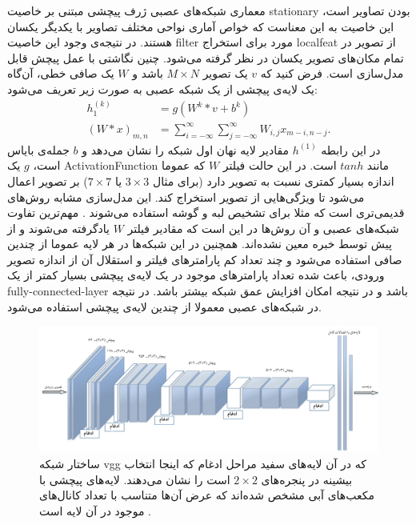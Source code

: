 معماری شبکه‌های عصبی ژرف پیچشی مبتنی بر خاصیت \gls{stationary} بودن تصاویر است، این خاصیت به این معناست که خواص آماری نواحی مختلف تصاویر با یکدیگر یکسان هستند. در نتیجه‌ی وجود این خاصیت \gls{filter} مورد برای استخراج \gls{localfeat} از تصویر در تمام مکان‌های تصویر یکسان در نظر گرفته می‌شود. چنین نگاشتی با عمل پیچش قابل مدل‌سازی است. فرض کنید که $v$ یک تصویر $M\times N$ باشد و $W$ یک صافی خطی، آن‌گاه یک لایه‌ی پیچشی از یک شبکه عصبی به صورت زیر تعریف می‌شود:
\begin{align}
h_1^{(k)} &= g(W^k \ast v + b^k) \label{eq:conv_layer}\\
(W \ast x)_{m,n} &= \sum_{i=-\infty}^{\infty} \sum_{j=-\infty}^{\infty} W_{i,j} x_{m -i, n-j}.
\end{align}
در این رابطه $h^{(1)}$ مقادیر لایه نهان اول شبکه را نشان می‌دهد و $b$ جمله‌‌ی بایاس است، $g$ یک  \gls{ActivationFunction} مانند $tanh$ است. در این حالت فیلتر $W$ که عموما اندازه بسیار کمتری نسبت به تصویر دارد (برای مثال $3 \times 3$ یا
$ 7 \times 7$)
بر تصویر اعمال می‌شود تا ویژگی‌هایی از تصویر استخراج کند. این مدل‌سازی مشابه روش‌های قدیمی‌تری است که مثلا برای تشخیص لبه و گوشه استفاده می‌شوند \cite{harris1988}. مهم‌ترین تفاوت شبکه‌های عصبی و آن روش‌ها در این است که مقادیر فیلتر $W$ یادگرفته می‌شوند و از پیش توسط خبره معین نشده‌اند. همچنین در این شبکه‌ها در هر لایه عموما از چندین صافی استفاده می‌شود و چند  تعداد کم پارامترهای فیلتر و استقلال آن از اندازه تصویر ورودی، باعث شده تعداد پارامتر‌های موجود در یک لایه‌ی پیچشی بسیار کمتر از یک \gls{fully-connected-layer} باشد و در نتیجه امکان افزایش عمق شبکه بیشتر باشد. در نتیجه در شبکه‌های عصبی معمولا از چندین لایه‌ی پیچشی استفاده می‌شود.
\begin{figure}[!t]
\centering
\includegraphics[width=1.1\linewidth]{images/vgg}
\caption[ساختار شبکه استخراج ویژگی]{
ساختار شبکه vgg که در آن لایه‌های سفید مراحل ادغام که اینجا انتخاب بیشینه در پنجره‌های $2 \times 2$ است را نشان می‌دهند.
لایه‌های پیچشی با مکعب‌های آبی مشخص شده‌اند که عرض آن‌ها متناسب با تعداد کانال‌های موجود در آن لایه است \cite{el2016face}.
}
\label{fig:vgg}
\end{figure}
